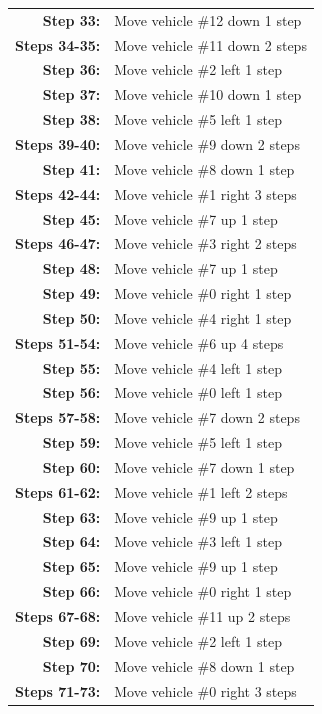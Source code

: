 \begin{longtable}{rl}
\textbf{Step 33:} & Move vehicle \#12 down 1 step \\
\textbf{Steps 34-35:} & Move vehicle \#11 down 2 steps \\
\textbf{Step 36:} & Move vehicle \#2 left 1 step \\
\textbf{Step 37:} & Move vehicle \#10 down 1 step \\
\textbf{Step 38:} & Move vehicle \#5 left 1 step \\
\textbf{Steps 39-40:} & Move vehicle \#9 down 2 steps \\
\textbf{Step 41:} & Move vehicle \#8 down 1 step \\
\textbf{Steps 42-44:} & Move vehicle \#1 right 3 steps \\
\textbf{Step 45:} & Move vehicle \#7 up 1 step \\
\textbf{Steps 46-47:} & Move vehicle \#3 right 2 steps \\
\textbf{Step 48:} & Move vehicle \#7 up 1 step \\
\textbf{Step 49:} & Move vehicle \#0 right 1 step \\
\textbf{Step 50:} & Move vehicle \#4 right 1 step \\
\textbf{Steps 51-54:} & Move vehicle \#6 up 4 steps \\
\textbf{Step 55:} & Move vehicle \#4 left 1 step \\
\textbf{Step 56:} & Move vehicle \#0 left 1 step \\
\textbf{Steps 57-58:} & Move vehicle \#7 down 2 steps \\
\textbf{Step 59:} & Move vehicle \#5 left 1 step \\
\textbf{Step 60:} & Move vehicle \#7 down 1 step \\
\textbf{Steps 61-62:} & Move vehicle \#1 left 2 steps \\
\textbf{Step 63:} & Move vehicle \#9 up 1 step \\
\textbf{Step 64:} & Move vehicle \#3 left 1 step \\
\textbf{Step 65:} & Move vehicle \#9 up 1 step \\
\textbf{Step 66:} & Move vehicle \#0 right 1 step \\
\textbf{Steps 67-68:} & Move vehicle \#11 up 2 steps \\
\textbf{Step 69:} & Move vehicle \#2 left 1 step \\
\textbf{Step 70:} & Move vehicle \#8 down 1 step \\
\textbf{Steps 71-73:} & Move vehicle \#0 right 3 steps \\
\end{longtable}



